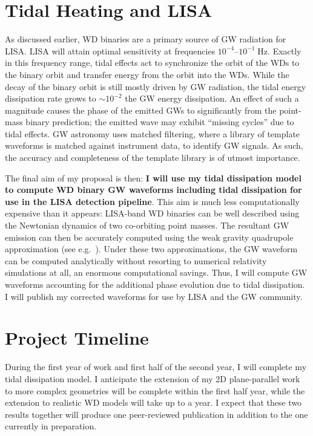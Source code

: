\documentclass[12pt,
        usenames, %
        dvipsnames %
    ]{article}
\begin{document}
\section{Tidal Heating and LISA}\label{s:4}

As discussed earlier, WD binaries are a primary source of GW radiation for
LISA\@. LISA will attain optimal sensitivity at frequencies
$10^{-4}$--$10^{-1}\;\mathrm{Hz}$\cite{LISA_band}. Exactly in this frequency
range, tidal effects act to synchronize the orbit of the WDs to the binary
orbit and transfer energy from the orbit into the WDs. While the decay
of the binary orbit is still mostly driven by GW radiation, the tidal energy
dissipation rate grows to $\sim10^{-2}$ the GW energy
dissipation\cite{fullerII,fullerIV}. An effect of such a magnitude causes the
phase of the emitted GWs to significantly from the point-mass binary
prediction; the emitted wave may exhibit ``missing cycles'' due to tidal
effects\cite{fullerII}. GW astronomy uses matched filtering, where a library of
template waveforms is matched against instrument data, to identify GW signals.
As such, the accuracy and completeness of the template library is of utmost
importance.

The final aim of my proposal is then: \textbf{I will use my tidal dissipation
model to compute WD binary GW waveforms including tidal dissipation for use in
the LISA detection pipeline}. This aim is much less computationally expensive
than it appears: LISA-band WD binaries can be well described using the Newtonian
dynamics of two co-orbiting point masses\cite{DWD_pointmass}. The resultant GW
emission can then be accurately computed using the weak gravity quadrupole
approximation (see e.g.~\cite{peters,lsst_wd}). Under these two approximations,
the GW waveform can be computed analytically without resorting to numerical
relativity simulations at all, an enormous computational savings. Thus, I will
compute GW waveforms accounting for the additional phase evolution due to tidal
dissipation. I will publish my corrected waveforms for use by LISA and the GW
community.

\section{Project Timeline}

During the first year of work and first half of the second year, I will complete
my tidal dissipation model. I anticipate the extension of my 2D plane-parallel
work to more complex geometries will be complete within the first half year,
while the extension to realistic WD models will take up to a year. I expect that
these two results together will produce one peer-reviewed publication in
addition to the one currently in preparation.
\end{document}
